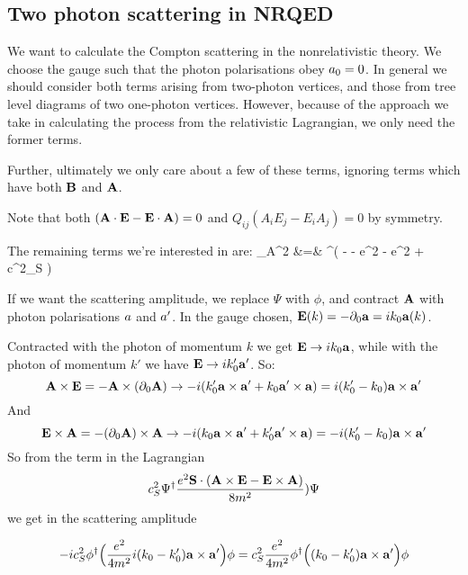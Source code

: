 \subsection{Two photon scattering in NRQED}



We want to calculate the Compton scattering in the nonrelativistic theory.  We choose the gauge such that the photon polarisations obey $a_0 = 0$.  In general we should consider both terms arising from two-photon vertices, and those from tree level diagrams of two one-photon vertices.  However, because of the approach we take in calculating the process from the relativistic Lagrangian, we only need the former terms.

Further, ultimately we only care about a few of these terms, ignoring terms which have both $\mathbf{B}$ and $\mathbf{A}$.

Note that both $(\mathbf{A} \cdot \mathbf{E} - \mathbf{E} \cdot \mathbf{A} )=0$ and $Q_{ij} (A_i E_j - E_i A_j) = 0$ by symmetry.

The remaining terms we're interested in are:
\scriptsize
\beqa
	_{A^2} &=& \Psi^\dagger ( -   - e^2  - e^2
		+ c^2_S  ) \Psi
\eeqa
\normalsize

If we want the scattering amplitude, we replace $\Psi$ with $\phi$, and contract $\mathbf{A}$ with photon polarisations $a$ and $a'$.  In the gauge chosen, $\mathbf{E}(k) = -\partial_0 \mathbf{a} = i k_0 \mathbf{a}(k)$.

Contracted with the photon of momentum $k$ we get $\mathbf{E} \to i k_0 \mathbf{a}$, while with the photon of momentum $k'$ we have $\mathbf{E} \to i k'_0 \mathbf{a'}$.  So:
\[
	\mathbf{A} \times \mathbf{E} = - \mathbf{A} \times (\partial_0 \mathbf{A})
		\to 
	-i(k_0' \mathbf{a} \times \mathbf{a'} + k_0 \mathbf{a'} \times \mathbf{a} ) = i ( k_0' - k_0) \mathbf{a} \times \mathbf{a'}
\]
And
\[
	\mathbf{E} \times \mathbf{A} = - (\partial_0 \mathbf{A}) \times  \mathbf{A}
		\to 
	-i( k_0 \mathbf{a} \times \mathbf{a'} + k_0' \mathbf{a'} \times \mathbf{a} ) = -i ( k_0' - k_0) \mathbf{a} \times \mathbf{a'}
\]
So from the term in the Lagrangian 
\[
 c^2_S \Psi^\dagger \frac{ e^2 \mathbf{S} \cdot ( \mathbf{A} \times \mathbf{E} - \mathbf{E} \times \mathbf{A} )}{8m^2} ) \Psi
\]
we get in the scattering amplitude

\[
  -i c^2_S \phi^\dagger  \Big ( \frac{e^2}{4m^2}    i(k_0 - k_0')    \mathbf{a} \times \mathbf{a'} \Big ) \phi
	=
     c^2_S \frac{e^2}{4m^2} \phi^\dagger  \Big ( (k_0 - k_0')    \mathbf{a} \times \mathbf{a'} \Big ) \phi
\]


